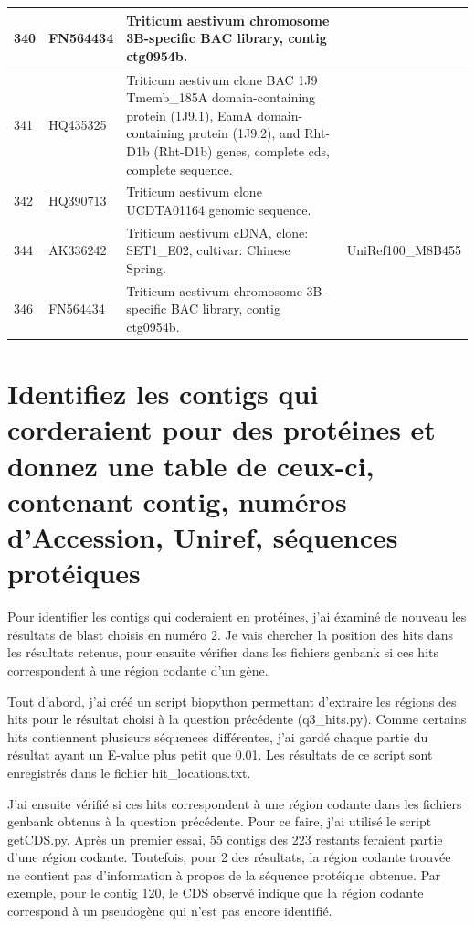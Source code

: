 \documentclass[10.9pt]{article} %
\begin{document}
{\begin{longtable}{|p{1.5cm}|p{2cm}|p{9cm}|p{3cm}|}
340 & FN564434 & Triticum aestivum chromosome 3B-specific BAC library, contig ctg0954b. & \\
\hline
341 & HQ435325 & Triticum aestivum clone BAC 1J9 Tmemb\_185A domain-containing protein (1J9.1), EamA domain-containing protein (1J9.2), and Rht-D1b (Rht-D1b) genes, complete cds, complete sequence. & \\
\hline
342 & HQ390713 & Triticum aestivum clone UCDTA01164 genomic sequence. & \\
\hline
344 & AK336242 & Triticum aestivum cDNA, clone: SET1\_E02, cultivar: Chinese Spring. & UniRef100\_M8B455\\
\hline
346 & FN564434 & Triticum aestivum chromosome 3B-specific BAC library, contig ctg0954b. & \\
\hline
\end{longtable}
}
\endgroup


 
\section{Identifiez les contigs qui corderaient pour des protéines et donnez une table de ceux-ci,
contenant contig, numéros d'Accession, Uniref, séquences protéiques} %

Pour identifier les contigs qui coderaient en protéines, j'ai éxaminé de nouveau les résultats de 
blast choisis en numéro 2. Je vais chercher la position des hits dans les résultats retenus, pour
ensuite vérifier dans les fichiers genbank si ces hits correspondent à une région codante d'un gène.

Tout d'abord, j'ai créé un script biopython permettant d'extraire les régions des hits pour le résultat
choisi à la question précédente (q3\_hits.py). Comme certains hits contiennent plusieurs séquences
différentes, j'ai gardé chaque partie du résultat ayant un E-value plus petit que 0.01. Les résultats
de ce script sont enregistrés dans le fichier hit\_locations.txt.


J'ai ensuite vérifié si ces hits correspondent à une région codante dans les fichiers genbank obtenus
à la question précédente. Pour ce faire, j'ai utilisé le script getCDS.py. Après un premier essai,
55 contigs des 223 restants feraient partie d'une région codante. Toutefois, pour 2 des résultats, la
région codante trouvée ne contient pas d'information à propos de la séquence protéique obtenue. Par exemple,
pour le contig 120, le CDS observé indique que la région codante correspond à un pseudogène qui n'est pas
encore identifié.
\end{document}
